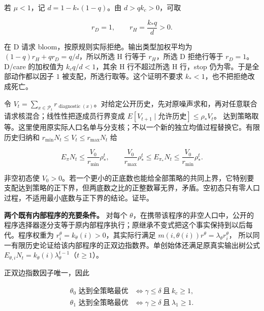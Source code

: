\documentclass[
  11pt,
  oneside]{book}
\begin{document}
若 \(\mu<1\)，记 \(d=1-k_*(1-q)\)。由 \(d>qk_c>0\)，可取

\[r_D=1,\qquad r_H=\frac{k_*q}{d}>0.\]

在 D 请求 bloom，按原规则实际拒绝。输出类型加权平均为 \((1-q)r_H+qr_D=q/d\)，所以所选 H 行等于 \(r_H\)，所选 D 拒绝行等于 \(r_D=1\)。D/care 的加权值为 \(k_cq/d<1\)，其余 H 行不超过所选 H 行，stop 仍为零。于是全部动作都以因子 \(1\) 被支配，所选行取等。这个证明不要求 \(k_*<1\)，也不把拒绝改成死亡。

令 \(V_t=\sum_{x\in\mathcal P_t}r_{\operatorname{diagnostic}(x)}\)。对给定公开历史，先对原噪声求和，再对任意联合请求核混合；线性性把逐成员行界变成 \(E[V_{t+1}\mid\text{允许历史}]\le\rho_*V_t\)。 达到策略取等。这里使用原实际人口名单与分支核；不以一个新的独立均值过程替换它。有限历史归纳和 \(r_{\min}N_t\le V_t\le r_{\max}N_t\) 给

\[E_\pi N_t\le\frac{V_0}{r_{\min}}\rho_*^t,\qquad
\frac{V_0}{r_{\max}}\rho_*^t
\le E_{\pi_*}N_t\le
\frac{V_0}{r_{\min}}\rho_*^t.\]

非空初态使 \(V_0>0\)。若一个更小的正底数也能给全部策略的共同上界，它特别要支配达到策略的正下界，但两底数之比的正整数幂无界，矛盾。空初态只有零人口过程，不适用最小底数与正下界的结论。证毕。

\textbf{两个既有内部程序的充要条件。} 对每个 \(\theta\)，在携带该程序的非空人口中，公开的程序选择器逐分支等于原内部程序执行；原继承不变式把这个事实保持到以后每代。程序权重为 \(r^\theta_i=k_\theta(i)>0\)，其实际行满足 \(m(i,\theta(i))r^\theta=\lambda_\theta r^\theta_i\)， 所以同一有限历史论证给该内部程序的正双边指数界。单创始体还满足原真实输出树公式 \(E_{\theta,i}N_t=k_\theta(i)\lambda_\theta^{t-1}\)（\(t\ge1\)）。

正双边指数因子唯一，因此

\[\boxed{
\begin{aligned}
\theta_0\text{ 达到全策略最优}
&\iff \gamma\le\delta\ \text{且}\ k_c\ge1,\\
\theta_1\text{ 达到全策略最优}
&\iff \gamma\ge\delta\ \text{且}\ \lambda_1\ge1.
\end{aligned}}\]
\end{document}
